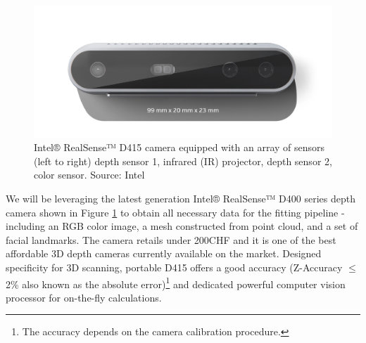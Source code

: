 \begin{figure}
    \centering
    \includegraphics[width=\textwidth]{Figures/stereo_DT_d415_front-crop1a-1.png}
    \caption{Intel® RealSense™ D415 camera equipped with an array of sensors (left to right) depth sensor 1, infrared (IR) projector, depth sensor 2, color sensor. Source: Intel}
    \label{f1.2}
\end{figure}

We will be leveraging the latest generation Intel® RealSense™ D400 series depth camera shown in Figure \ref{f1.2} to obtain all necessary data for the fitting pipeline - including an RGB color image, a mesh constructed from point cloud, and a set of facial landmarks. The camera retails under 200CHF and it is one of the best affordable 3D depth cameras currently available on the market. Designed specificity for 3D scanning, portable D415 offers a good accuracy (Z-Accuracy $\leq$2\% also known as the absolute error)\footnote{The accuracy depends on the camera calibration procedure.} and dedicated powerful computer vision processor for on-the-fly calculations.


